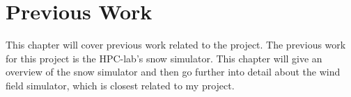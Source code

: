 \chapter{Previous Work}
\label{chap:prevwork}

This chapter will cover previous work related to the project. The previous work for 
this project is the HPC-lab's snow simulator. This chapter will give an overview 
of the snow simulator and then go further into detail about the wind field simulator, 
which is closest related to my project. 


